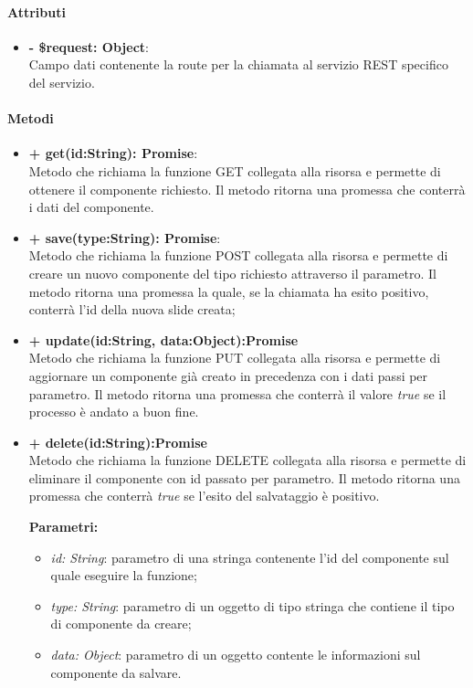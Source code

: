 	\paragraph{Attributi}
	\begin{itemize}
		\item \textbf{- \$request: Object}:\\
		Campo dati contenente la route per la chiamata al servizio REST specifico del servizio.
	\end{itemize}	
	
	\paragraph{Metodi}
	\begin{itemize}
		\item \textbf{+ get(id:String): Promise}:\\
			Metodo che richiama la funzione GET collegata alla risorsa e permette di ottenere il componente richiesto. Il metodo ritorna una promessa che conterrà i dati del componente.
		\item \textbf{+ save(type:String): Promise}:\\
			Metodo che richiama la funzione POST collegata alla risorsa e permette di creare un nuovo componente del tipo richiesto attraverso il parametro. Il metodo ritorna una promessa la quale, se la chiamata ha esito positivo, conterrà l'id della nuova slide creata;\\
		\item \textbf{+ update(id:String, data:Object):Promise}\\
			Metodo che richiama la funzione PUT collegata alla risorsa e permette di aggiornare un componente già creato in precedenza con i dati passi per parametro. Il metodo ritorna una promessa che conterrà il valore \textit{true} se il processo è andato a buon fine. 
		\item \textbf{+ delete(id:String):Promise}\\
			Metodo che richiama la funzione DELETE collegata alla risorsa e permette di eliminare il componente con id passato per parametro. Il metodo ritorna una promessa che conterrà \textit{true} se l'esito del salvataggio è positivo.
		
		\textbf{Parametri:}\\
		\begin{itemize}
			\item \textit{id: String}: parametro di una stringa contenente l'id del componente sul quale eseguire la funzione;
			\item \textit{type: String}: parametro di un oggetto di tipo stringa che contiene il tipo di componente da creare;
			\item \textit{data: Object}: parametro di un oggetto contente le informazioni sul componente da salvare.
		\end{itemize}
	\end{itemize}